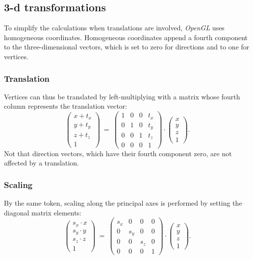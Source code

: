 \subsection{3-d transformations}

To simplify the calculations when translations are involved, \textit{OpenGL} uses homogeneous coordinates.
Homogeneous coordinates append a fourth component to the three-dimensional vectors, which is set to zero for
directions and to one for vertices.


\subsubsection{Translation}
Vertices can thus be translated by left-multiplying with a matrix whose fourth column represents the translation
vector:
\begin{equation}
	\left( \begin{array}{c} x + t_x \\ y + t_y \\ z + t_z \\ 1 \end{array} \right) 
	\ =\  
	\left( \begin{array}{cccc} 
		1 & 0 & 0 & t_x \\
		0 & 1 & 0 & t_y \\
		0 & 0 & 1 & t_z \\
		0 & 0 & 0 & 1
	\end{array} \right) \cdot
	\left( \begin{array}{c} x \\ y \\ z \\ 1 \end{array} \right).
\end{equation}
Not that direction vectors, which have their fourth component zero, are not affected by a translation.


\subsubsection{Scaling}
By the same token, scaling along the principal axes is performed by setting the diagonal matrix elements:
\begin{equation}
	\left( \begin{array}{c} s_x \cdot x \\ s_y \cdot y \\ s_z \cdot z \\ 1 \end{array} \right) 
	\ =\  
	\left( \begin{array}{cccc} 
		s_x & 0 & 0 & 0 \\
		0 & s_y & 0 & 0 \\
		0 & 0 & s_z & 0 \\
		0 & 0 & 0 & 1
	\end{array} \right) \cdot
	\left( \begin{array}{c} x \\ y \\ z \\ 1 \end{array} \right).
\end{equation}


